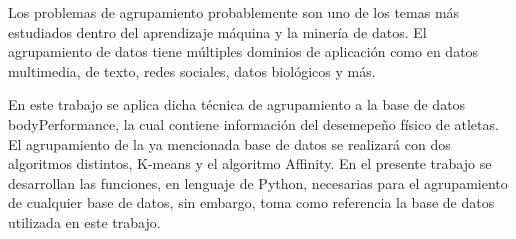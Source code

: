 Los problemas de agrupamiento probablemente son uno de los temas más estudiados dentro del aprendizaje máquina y la minería de datos. El agrupamiento de datos tiene múltiples dominios de aplicación como en datos multimedia, de texto, redes sociales, datos biológicos y más.

En este trabajo se aplica dicha técnica de agrupamiento a la base de datos bodyPerformance, la cual contiene información del desemepeño físico de atletas. El agrupamiento de la ya mencionada base de datos se realizará con dos algoritmos distintos, K-means y el algoritmo Affinity. En el presente trabajo se desarrollan las funciones, en lenguaje de Python, necesarias para el agrupamiento de cualquier base de datos, sin embargo, toma como referencia la base de datos utilizada en este trabajo.
